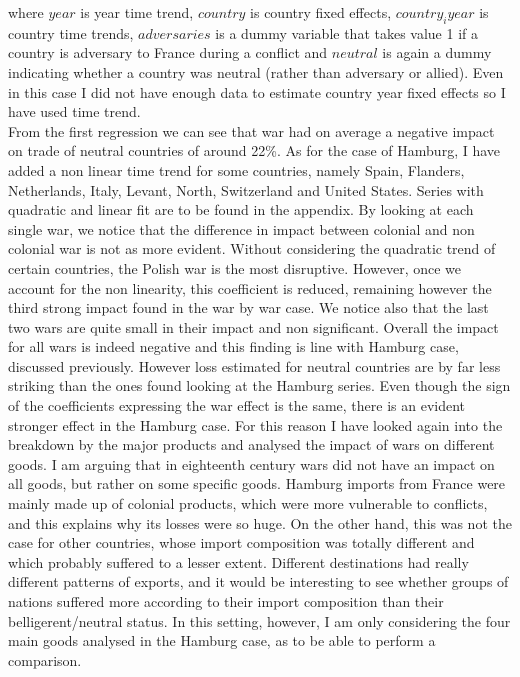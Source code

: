 \documentclass[12pt,a4paper,titlepage]{article}
\begin{document}
where $year$ is year time trend, $country$ is country fixed effects, $country_iyear$ is country time trends, $adversaries$ is a dummy variable that takes value 1 if a country is adversary to France during a conflict and $neutral$ is again a dummy indicating whether a country was neutral (rather than adversary or allied). Even in this case I did not have enough data to estimate country year fixed effects so I have used time trend.\\
From the first regression we can see that war had on average a negative impact on trade of neutral countries of around 22\%. As for the case of Hamburg, I have added a non linear time trend for some countries, namely Spain, Flanders, Netherlands, Italy, Levant, North, Switzerland and United States. Series with quadratic and linear fit are to be found in the appendix. 
By looking at each single war, we notice that the difference in impact between colonial and non colonial war is not as more evident. Without considering the quadratic trend of certain countries, the Polish war is the most disruptive. However, once we account for the non linearity, this coefficient is reduced, remaining however the third strong impact found in the war by war case. We notice also that the last two wars are quite small in their impact and non significant.
Overall the impact for all wars is indeed negative and this finding is line with Hamburg case, discussed previously. However loss estimated for neutral countries are by far less striking than the ones found looking at the Hamburg series. Even though the sign of the coefficients expressing the war effect is the same, there is an evident stronger effect in the Hamburg case. For this reason I have looked again into the breakdown by the major products and analysed the impact of wars on different goods. I am arguing that in eighteenth century wars did not have an impact on all goods, but rather on some specific goods. Hamburg imports from France were mainly made up of colonial products, which were more vulnerable to conflicts, and this explains why its losses were so huge. On the other hand, this was not the case for other countries, whose import composition was totally different and which probably suffered to a lesser extent. Different destinations had really different patterns of exports, and it would be interesting to see whether groups of nations suffered more according to their import composition than their belligerent/neutral status. 
In this setting, however, I am only considering the four main goods analysed in the Hamburg case, as to be able to perform a comparison.\\
\end{document}
